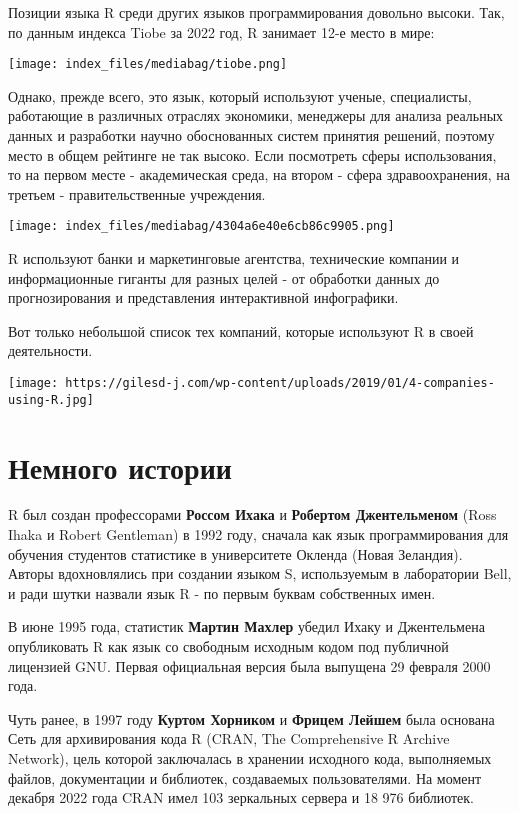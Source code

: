 \documentclass[
  letterpaper,
  DIV=11,
  numbers=noendperiod]{scrreprt}
\begin{document}
Позиции языка R среди других языков программирования довольно высоки.
Так, по данным индекса Tiobe за 2022 год, R занимает 12-е место в мире:

\texttt{[image: index\_files/mediabag/tiobe.png]}

Однако, прежде всего, это язык, который используют ученые, специалисты,
работающие в различных отраслях экономики, менеджеры для анализа
реальных данных и разработки научно обоснованных систем принятия
решений, поэтому место в общем рейтинге не так высоко. Если посмотреть
сферы использования, то на первом месте - академическая среда, на втором
- сфера здравоохранения, на третьем - правительственные учреждения.

\texttt{[image: index\_files/mediabag/4304a6e40e6cb86c9905.png]}

R используют банки и маркетинговые агентства, технические компании и
информационные гиганты для разных целей - от обработки данных до
прогнозирования и представления интерактивной инфографики.

Вот только небольшой список тех компаний, которые используют R в своей
деятельности.

\texttt{[image: https://gilesd-j.com/wp-content/uploads/2019/01/4-companies-using-R.jpg]}

\hypertarget{ux43dux435ux43cux43dux43eux433ux43e-ux438ux441ux442ux43eux440ux438ux438}{%
\section{Немного
истории}\label{ux43dux435ux43cux43dux43eux433ux43e-ux438ux441ux442ux43eux440ux438ux438}}

R был создан профессорами \textbf{Россом Ихака} и \textbf{Робертом
Джентельменом} (Ross Ihaka и Robert Gentleman) в 1992 году, сначала как
язык программирования для обучения студентов статистике в университете
Окленда (Новая Зеландия). Авторы вдохновлялись при создании языком S,
используемым в лаборатории Bell, и ради шутки назвали язык R - по первым
буквам собственных имен.

В июне 1995 года, статистик \textbf{Мартин Махлер} убедил Ихаку и
Джентельмена опубликовать R как язык со свободным исходным кодом под
публичной лицензией GNU. Первая официальная версия была выпущена 29
февраля 2000 года.

Чуть ранее, в 1997 году \textbf{Куртом Хорником} и \textbf{Фрицем
Лейшем} была основана Сеть для архивирования кода R (CRAN, The
Comprehensive R Archive Network), цель которой заключалась в хранении
исходного кода, выполняемых файлов, документации и библиотек,
создаваемых пользователями. На момент декабря 2022 года CRAN имел 103
зеркальных сервера и 18 976 библиотек.
\end{document}
